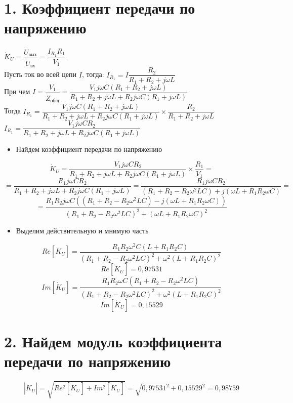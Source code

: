 \documentclass[12pt, a4paper]{report}
\begin{document}
    \section{\textbf{1. Коэффициент передачи по напряжению}}
    \begin{itemize}
        $ \dot{K}_U = \dfrac{\dot{U}_{\text{вых}}}{\dot{U}_{\text{вх}}} = \dfrac{I_{R_1}R_1}{V_1} $\\\bigskip
        Пусть ток во всей цепи $I$, тогда: $I_{R_1} = I\dfrac{R_2}{R_1 + R_2 + j\omega L}$\\\bigskip
        При чем $I = \dfrac{V_1}{\dot{Z}_{\text{общ}}} = \dfrac{V_{1}j\omega C(R_1 + R_2 + j\omega L)}{R_1 + R_2 + j\omega L + R_{2}j\omega C(R_1 + j\omega L)}$\\\bigskip
        Тогда $I_{R_1} = \dfrac{V_{1}j\omega C(R_1 + R_2 + j\omega L)}{R_1 + R_2 + j\omega L + R_{2}j\omega C(R_1 + j\omega L)} \times \dfrac{R_2}{R_1 + R_2 + j\omega L} $\\\bigskip
        $I_{R_1} = \dfrac{V_{1}j\omega CR_2}{R_1 + R_2 + j\omega L + R_{2}j\omega C(R_1 + j\omega L)} $\\\bigskip
    \end{itemize}
    \begin{itemize}
        \item Найдем коэффициент передачи по напряжению
    \end{itemize}
    \[ \dot{K}_U = \frac{V_{1}j\omega CR_2}{R_1 + R_2 + j\omega L + R_{2}j\omega C(R_1 + j\omega L)} \times \frac{R_1}{V_1} = \]
    \[ = \frac{R_{1}j\omega CR_2}{R_1 + R_2 + j\omega L + R_{2}j\omega C(R_1 + j\omega L)} = \frac{R_{1}j\omega CR_2}{(R_1 + R_2 - R_{2}\omega^{2}LC) + j(\omega L + R_{1}R_{2}\omega C)} = \]
    \[ = \frac{R_{1}R_{2}j\omega C((R_1 + R_2 - R_{2}\omega^{2}LC) - j(\omega L + R_{1}R_{2}\omega C))}{(R_1 + R_2 - R_{2}\omega^{2}LC)^{2} + (\omega L + R_{1}R_{2}\omega C)^2} \]\bigskip
    \begin{itemize}
        \item Выделим действительную и мнимую часть
    \end{itemize}
    \[ Re[\dot{K}_U] = \dfrac{R_{1}R_{2}\omega^{2} C(L + R_{1}R_{2}C)}{(R_1 + R_2 - R_{2}\omega^{2}LC)^2 + \omega^{2}(L + R_{1}R_{2}C)^2} \]
    \[ Re[\dot{K}_U] = 0,97531 \]
    \[ Im[\dot{K}_U] = \dfrac{R_{1}R_{2}\omega C(R_1 + R_2 - R_{2}\omega^{2}LC)}{(R_1 + R_2 - R_{2}\omega^{2}LC)^2 + \omega^{2}(L + R_{1}R_{2}C)^2} \]
    \[ Im[\dot{K}_U] = 0,15529 \]\bigskip

    \section{\textbf{2. Найдем модуль коэффициента передачи по напряжению}}
    \[ |\dot{K}_{U}| = \sqrt{Re^{2}[\dot{K}_U] + Im^{2}[\dot{K}_U]} = \sqrt{0,97531^{2} + 0,15529^{2}} = 0,98759 \]
\end{document}
